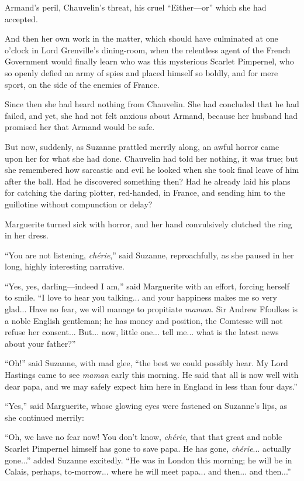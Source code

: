 Armand's peril, Chauvelin's threat, his cruel \enquote{Either---or\longdash} which she had accepted.

And then her own work in the matter, which should have culminated at one o'clock in Lord Grenville's dining-room, when the relentless agent of the French Government would finally learn who was this mysterious Scarlet Pimpernel, who so openly defied an army of spies and placed himself so boldly, and for mere sport, on the side of the enemies of France.

Since then she had heard nothing from Chauvelin. She had concluded that he had failed, and yet, she had not felt anxious about Armand, because her husband had promised her that Armand would be safe.

But now, suddenly, as Suzanne prattled merrily along, an awful horror came upon her for what she had done. Chauvelin had told her nothing, it was true; but she remembered how sarcastic and evil he looked when she took final leave of him after the ball. Had he discovered something then? Had he already laid his plans for catching the daring plotter, red-handed, in France, and sending him to the guillotine without compunction or delay?

Marguerite turned sick with horror, and her hand convulsively clutched the ring in her dress.

\enquote{You are not listening, \textit{chérie},} said Suzanne, reproachfully, as she paused in her long, highly interesting narrative.

\enquote{Yes, yes, darling---indeed I am,} said Marguerite with an effort, forcing herself to smile. \enquote{I love to hear you talking... and your happiness makes me so very glad... Have no fear, we will manage to propitiate \textit{maman}. Sir Andrew Ffoulkes is a noble English gentleman; he has money and position, the Comtesse will not refuse her consent... But... now, little one... tell me... what is the latest news about your father?}

\enquote{Oh!} said Suzanne, with mad glee, \enquote{the best we could possibly hear. My Lord Hastings came to see \textit{maman} early this morning. He said that all is now well with dear papa, and we may safely expect him here in England in less than four days.}

\enquote{Yes,} said Marguerite, whose glowing eyes were fastened on Suzanne's lips, as she continued merrily:

\enquote{Oh, we have no fear now! You don't know, \textit{chérie}, that that great and noble Scarlet Pimpernel himself has gone to save papa. He has gone, \textit{chérie}... actually gone...} added Suzanne excitedly. \enquote{He was in London this morning; he will be in Calais, perhaps, to-morrow... where he will meet papa... and then... and then...}

